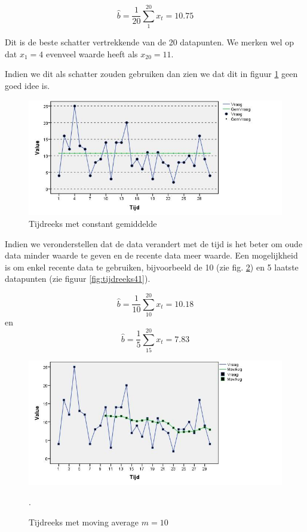\[ \widehat{b} = \frac{1}{20} \sum_{1}^{20} x_{t}= 10.75 \] 

Dit is de beste schatter vertrekkende van de 20 datapunten. We merken wel op dat $x_{1} =  4$ evenveel waarde heeft als $x_{20} = 11$. 

Indien we dit als schatter zouden gebruiken dan zien we dat dit in figuur \ref{fig:tijdreeks21} geen goed idee is.

\begin{figure}[htbp]
	\centering
		\includegraphics[width=1.00\textwidth]{images/tijdsreeksen/tijdsreeks21.jpg}
	\caption{Tijdreeks met constant gemiddelde}
	\label{fig:tijdreeks21}
\end{figure}


Indien we veronderstellen dat de data verandert met de tijd is het beter om oude data minder waarde te geven en de recente data meer waarde. Een mogelijkheid is om enkel recente data te gebruiken, bijvoorbeeld de 10 (zie fig. \ref{fig:tijdreeks31}) en 5 laatste datapunten (zie figuur \ref{fig:tijdreeks41}).

\[ \widehat{b} = \frac{1}{10} \sum_{10}^{20} x_{t} = 10.18 \] en
\[ \widehat{b} = \frac{1}{5} \sum_{15}^{20} x_{t} = 7.83 \]

\begin{figure}
	\centering
		\includegraphics[width=1.00\textwidth]{images/tijdsreeksen/tijdsreeks31.jpg}
		\caption{Tijdreeks met moving average $m = 10$}. 
	\label{fig:tijdreeks31}
\end{figure}

